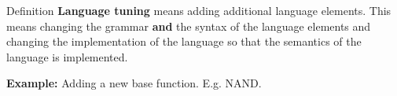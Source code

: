 \begin{frame}
\vspace*{2mm}
\begin{block}{
Definition
}
{\bf Language tuning} means adding additional language elements.
This means changing the grammar {\bf and} the syntax of the language elements
and changing the implementation of the language so that the semantics
of the language is implemented.
 
{\bf Example:} Adding a new base function. E.g. NAND.
\end{block}
\end{frame}